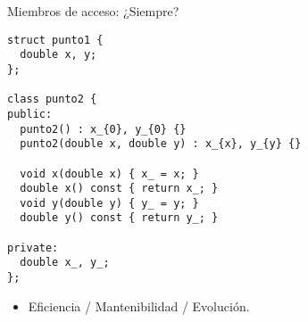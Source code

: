 \begin{frame}[t,fragile]{Miembros de acceso: ¿Siempre?}
\begin{lstlisting}
struct punto1 {
  double x, y;
};

class punto2 {
public:
  punto2() : x_{0}, y_{0} {}
  punto2(double x, double y) : x_{x}, y_{y} {}
  
  void x(double x) { x_ = x; }
  double x() const { return x_; }
  void y(double y) { y_ = y; }
  double y() const { return y_; }

private:
  double x_, y_;
};
\end{lstlisting}
\begin{itemize}
  \item Eficiencia / Mantenibilidad / Evolución.
\end{itemize}
\end{frame}
